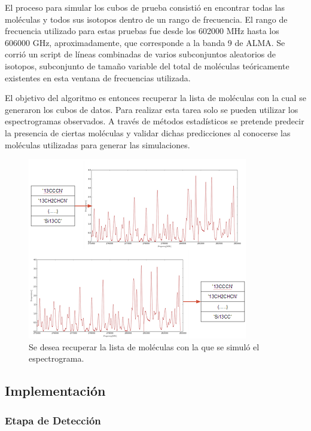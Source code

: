 El proceso para simular los cubos de prueba consistió en encontrar todas las moléculas y todos sus isotopos dentro de un rango de frecuencia. El rango de frecuencia utilizado para estas pruebas fue desde los 602000 MHz hasta los 606000 GHz, aproximadamente, que corresponde a la banda 9 de ALMA. Se corrió un script de líneas combinadas de varios subconjuntos aleatorios de isotopos, subconjunto de tamaño variable del total de moléculas teóricamente existentes en esta ventana de frecuencias utilizada.

El objetivo del algoritmo es entonces recuperar la lista de moléculas con la cual se generaron los cubos de datos. Para realizar esta tarea solo se pueden utilizar los espectrogramas observados. A través de métodos estadísticos se pretende predecir la presencia de ciertas moléculas y validar dichas predicciones al conocerse las moléculas utilizadas para generar las simulaciones.


\begin{figure}[H]
	\begin{center}
		\includegraphics{images/fig0}
		\caption{Se desea recuperar la lista de moléculas con la que se simuló el espectrograma. }
	\end{center}
\end{figure}



\subsection{Implementación}

\subsubsection{Etapa de Detección}

